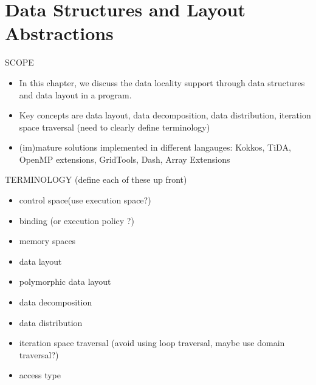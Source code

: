 \chapter{Data Structures and Layout Abstractions}
\label{ch:datastructures}



SCOPE
\begin{itemize}
\item In this chapter, we discuss the data locality support through data structures and data layout in a program. 
\item Key concepts are data layout, data decomposition, data distribution, iteration space traversal (need to clearly define terminology)
\item (im)mature solutions implemented in different langauges: Kokkos, TiDA, OpenMP extensions, GridTools, Dash, Array Extensions
\end{itemize}


TERMINOLOGY (define each of these up front)
\begin{itemize}
\item control space(use execution space?)
\item binding  (or execution policy ?)
\item memory spaces
\item data layout
\item polymorphic data layout
\item data decomposition 
\item data distribution 
\item iteration space traversal (avoid using loop traversal, maybe use domain traversal?) 
\item access type
\end{itemize}


